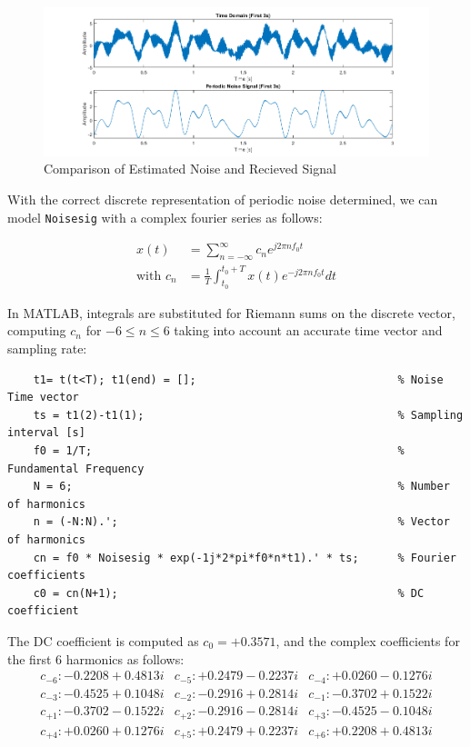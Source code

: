 \documentclass[12pt]{article}
\numberwithin{equation}{section}
\numberwithin{figure}{section}
\numberwithin{table}{section}
\begin{document}
\begin{figure}[ht]
    \centering
    \includegraphics{figures/p2-noisecomp.png}
    \caption{Comparison of Estimated Noise and Recieved Signal\label{fig:p2-noisecomp}}
\end{figure}

With the correct discrete representation of periodic noise determined, we can
model \verb+Noisesig+ with a complex fourier series as follows:

\begin{align*}
    x(t)             & = \sum_{n=-\infty}^{\infty} c_n e^{j 2\pi n f_0 t}          \\
    \text{with } c_n & = \frac{1}{T} \int^{t_0 + T}_{t_0} x(t)e^{-j2\pi nf_0 t} dt
\end{align*}

In MATLAB, integrals are substituted for Riemann sums on the discrete vector,
computing $c_n$ for $-6\le n \le 6$ taking into account an accurate time vector
and sampling rate:

\begin{verbatim}
    t1= t(t<T); t1(end) = [];                               % Noise Time vector 
    ts = t1(2)-t1(1);                                       % Sampling interval [s]
    f0 = 1/T;                                               % Fundamental Frequency
    N = 6;                                                  % Number of harmonics
    n = (-N:N).';                                           % Vector of harmonics
    cn = f0 * Noisesig * exp(-1j*2*pi*f0*n*t1).' * ts;      % Fourier coefficients
    c0 = cn(N+1);                                           % DC coefficient
\end{verbatim}

The DC coefficient is computed as $c_0 = +0.3571$, and the complex coefficients
for the first 6 harmonics as follows:
\[
    \begin{array}{ccc}
        c_{-6} : -0.2208 + 0.4813i & c_{-5} : +0.2479 - 0.2237i & c_{-4} : +0.0260 - 0.1276i \\
        c_{-3} : -0.4525 + 0.1048i & c_{-2} : -0.2916 + 0.2814i & c_{-1} : -0.3702 + 0.1522i \\
        c_{+1} : -0.3702 - 0.1522i & c_{+2} : -0.2916 - 0.2814i & c_{+3} : -0.4525 - 0.1048i \\
        c_{+4} : +0.0260 + 0.1276i & c_{+5} : +0.2479 + 0.2237i & c_{+6} : +0.2208 + 0.4813i \\
    \end{array}
\]
\end{document}
